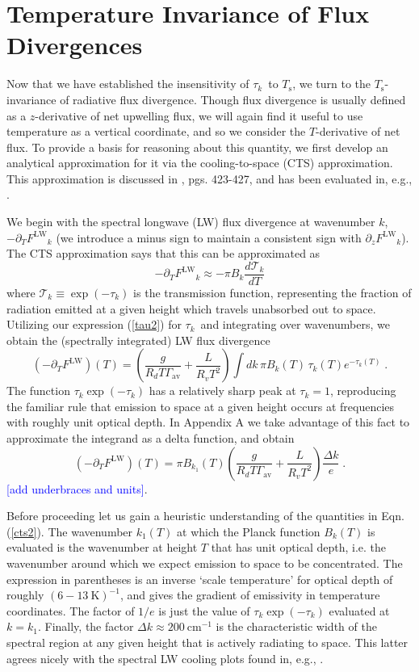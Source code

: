 \documentclass[10pt]{article}
\newcommand{\comment}[1]{\textcolor{blue}{[{#1}]}}
\newcommand{\beqn}{\begin{equation}}
\newcommand{\eeqn}{\end{equation}}
\newcommand{\eqnref}[1]{(\ref{#1})}
\newcommand{\inverse}{^{-1}}
\newcommand{\ppz}{\ensuremath{\partial_z}}
\newcommand{\ppt}{\ensuremath{\partial_T}}
\newcommand{\FLW}{\ensuremath{F^\mathrm{LW}}}
\newcommand{\trans}{\ensuremath{\mathcal{T}}}
\newcommand{\cminverse}{\ensuremath{\mathrm{cm^{-1}}}}
\newcommand{\tauk}{\ensuremath{\tau_k}}
\newcommand{\Ts}{\ensuremath{T_\mathrm{s}}}
\newcommand{\gammaav}{\ensuremath{\Gamma_\mathrm{av}}}
\begin{document}
\section{Temperature Invariance of Flux Divergences}
Now that we have established the insensitivity of  \tauk\  to \Ts, we turn to the \Ts-invariance of radiative flux divergence. Though flux divergence is usually defined as a $z$-derivative of net upwelling flux, we will again find it useful to use temperature as a vertical coordinate, and so we consider the $T$-derivative of net flux. To provide a basis for reasoning about this quantity, we first develop an analytical approximation for it via the cooling-to-space (CTS) approximation. This approximation is discussed in \cite{thomas2002}, pgs. 423-427, and has been evaluated in, e.g., \cite{fels1975,rodgers1966}.

	We begin with the spectral longwave (LW) flux divergence at wavenumber $k$, $-\ppt \FLW_k$ (we introduce a minus sign to maintain a consistent sign with  $\ppz \FLW_k$). The CTS approximation says that this  can be approximated as
	\beqn
		-\ppt \FLW_k \approx - \pi B_k \frac{d \trans_k}{dT}
	\label{cts_spectral}
	\eeqn
where  $\trans_k\equiv \exp(-\tauk)$ is the transmission function,  representing the fraction of radiation emitted at a given height which travels unabsorbed out to space. Utilizing our expression \eqnref{tau2} for \tauk\ and integrating over wavenumbers,  we obtain the (spectrally integrated) LW flux divergence
	\beqn
		(-\ppt \FLW)(T)  = \left( \frac{g}{R_dT\gammaav} + \frac{L}{R_v T^2}\right) \int dk\, \pi B_k(T)\, \tauk(T) e^{-\tauk(T)}  \; .
	\label{cts1}
	\eeqn
The function $\tauk \exp(-\tauk)$ has a relatively sharp peak at $\tauk=1$, reproducing the familiar rule that emission to space at a given height occurs at frequencies with roughly unit optical depth. In Appendix A we take advantage of this fact to approximate the integrand as a delta function, and obtain
	\beqn
		(-\ppt \FLW)(T)  = \pi B_{k_1}(T) \left( \frac{g}{R_dT\gammaav} + \frac{L}{R_v T^2}\right) \frac{\Delta k}{e} \; .
		\label{cts2}
	\eeqn
\comment{add underbraces and units}.

 Before proceeding let us gain a heuristic understanding of the quantities in Eqn. \eqnref{cts2}. The wavenumber $k_1(T)$ at which the Planck function $B_k(T)$ is evaluated  is the wavenumber  at height $T$ that has unit optical depth, i.e. the wavenumber around which we expect emission to space to be concentrated. The expression in parentheses is an inverse  `scale temperature' for optical depth of roughly $\mathrm{(6 -13\ K)}\inverse$, and gives the gradient of emissivity in temperature coordinates. The factor of $1/e$ is just the value of $\tauk \exp(-\tauk)$ evaluated at $k=k_1$. Finally, the factor $\Delta k \approx 200\ \cminverse$ is the characteristic  width of the spectral region at any given height that is actively radiating to space.  This latter agrees nicely with the spectral LW cooling plots found in, e.g., \cite{huang2013,clough1992}.
 
\end{document}
